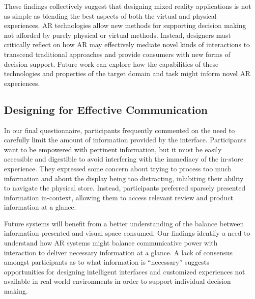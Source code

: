 These findings collectively suggest that designing mixed reality applications is not as simple as blending the best aspects of both the virtual and physical experiences. AR technologies allow new methods for supporting decision making not afforded by purely physical or virtual methods. Instead, designers must critically reflect on how AR may effectively mediate novel kinds of interactions to transcend traditional approaches and provide consumers with new forms of decision support. Future work can explore how the capabilities of these technologies and properties of the target domain and task might inform novel AR experiences.

\subsection{Designing for Effective Communication}
In our final questionnaire, participants frequently commented on the need to carefully limit the amount of information provided by the interface. Participants want to be empowered with pertinent information, but it must be easily accessible and digestible to avoid interfering with the immediacy of the in-store experience. They expressed some concern about trying to process too much information and about the display being too distracting, inhibiting their ability to navigate the physical store. Instead, participants preferred sparsely presented information in-context, allowing them to access relevant review and product information at a glance. 

Future systems will benefit from a better understanding of the balance between information presented and visual space consumed. Our findings identify a need to understand how AR systems might balance communicative power with interaction to deliver necessary information at a glance. A lack of consensus amongst participants as to what information is ``necessary'' suggests opportunities for designing intelligent interfaces and customized experiences not available in real world environments in order to support individual decision making. 

